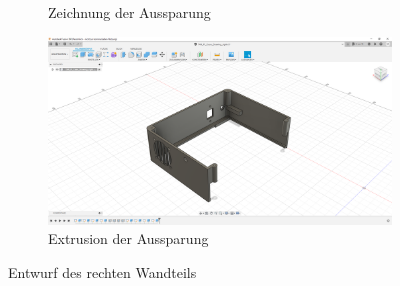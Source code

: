 \begin{figure}[H]
\begin{subfigure}[t]{.3\linewidth}
		\caption[Zeichnung der Aussparung]{Zeichnung der Aussparung}
		\label{fig:design-right-15}
	\end{subfigure}
	\begin{subfigure}[t]{.3\linewidth}
		\includegraphics[width=\linewidth]{img/konstruktion_gehaeuse_rechts_016.png}
		\caption[Extrusion der Aussparung]{Extrusion der Aussparung}
		\label{fig:design-right-16}
	\end{subfigure}
	\caption[Entwurf des rechten Wandteils]{Entwurf des rechten Wandteils}
	\label{fig:design-right}
\end{figure}\par

